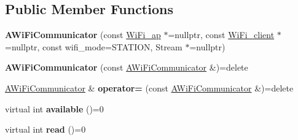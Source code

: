 \subsection*{Public Member Functions}
\begin{DoxyCompactItemize}
\item 
\mbox{\label{classwood_box_1_1communication_1_1wifi_1_1_a_wi_fi_communicator_a9d1dc13ca9243170b04211bef2b86ed2}} 
{\bfseries A\+Wi\+Fi\+Communicator} (const \mbox{\hyperlink{structs__wifi__access__point}{Wi\+Fi\+\_\+ap}} $\ast$=nullptr, const \mbox{\hyperlink{structs__wifi__client}{Wi\+Fi\+\_\+client}} $\ast$=nullptr, const wifi\+\_\+mode=S\+T\+A\+T\+I\+ON, Stream $\ast$=nullptr)
\item 
\mbox{\label{classwood_box_1_1communication_1_1wifi_1_1_a_wi_fi_communicator_aef6faae3bf738776f0fb437a45c27883}} 
{\bfseries A\+Wi\+Fi\+Communicator} (const \mbox{\hyperlink{classwood_box_1_1communication_1_1wifi_1_1_a_wi_fi_communicator}{A\+Wi\+Fi\+Communicator}} \&)=delete
\item 
\mbox{\label{classwood_box_1_1communication_1_1wifi_1_1_a_wi_fi_communicator_a9f3c118a4268d09632f483aeb736a7c8}} 
\mbox{\hyperlink{classwood_box_1_1communication_1_1wifi_1_1_a_wi_fi_communicator}{A\+Wi\+Fi\+Communicator}} \& {\bfseries operator=} (const \mbox{\hyperlink{classwood_box_1_1communication_1_1wifi_1_1_a_wi_fi_communicator}{A\+Wi\+Fi\+Communicator}} \&)=delete
\item 
\mbox{\label{classwood_box_1_1communication_1_1wifi_1_1_a_wi_fi_communicator_a541a26bf14cf77c13cc960963944ba1d}} 
virtual int {\bfseries available} ()=0
\item 
\mbox{\label{classwood_box_1_1communication_1_1wifi_1_1_a_wi_fi_communicator_af4bc1adc96c124e769eb8c54d76476cf}} 
virtual int {\bfseries read} ()=0
\item 
\mbox{\label{classwood_box_1_1communication_1_1wifi_1_1_a_wi_fi_communicator_ae0a1f2f1906f76a12dd5f9b7c10b1282}} 

\end{DoxyCompactItemize}
